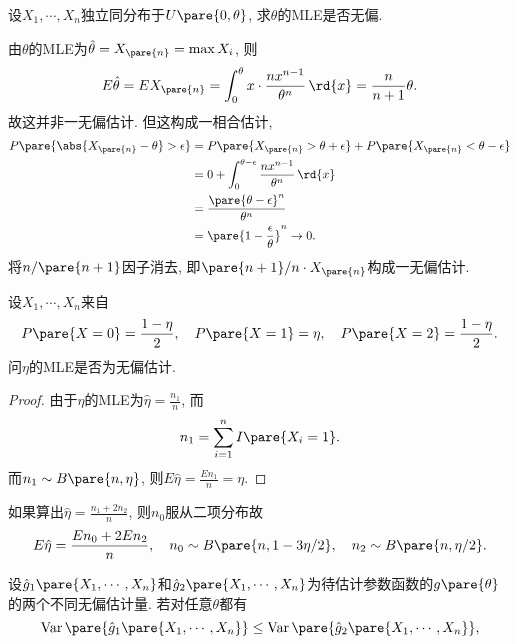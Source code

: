 \documentclass{ctexart}
\DeclareMathOperator{\Var}{Var}
\begin{document}
\begin{sample}
    \begin{ex}
        设$X_1,\cdots,X_n$独立同分布于$U\pare{0,\theta}$, 求$\theta$的MLE是否无偏.
    \end{ex}
    \begin{solution}
        由$\theta$的MLE为$\hat\theta = X_{\pare{n}} = \max X_i$, 则
        \[ E\hat{\theta} = EX_{\pare{n}} = \int_0^\theta x\cdot \frac{nx^{n-1}}{\theta^n}\,\rd{x} = \frac{n}{n+1}\theta. \]
        故这并非一无偏估计. 但这构成一相合估计,
        \begin{align*}
            P\pare{\abs{X_{\pare{n}}-\theta}>\epsilon} &= P\pare{X_{\pare{n}} > \theta + \epsilon} + P\pare{X_{\pare{n}} < \theta-\epsilon} \\
            &= 0 + \int_0^{\theta-\epsilon} \frac{nx^{n-1}}{\theta^n} \,\rd{x} \\
            &= \frac{\pare{\theta-\epsilon}^n}{\theta^n} \\
            &= \pare{1-\frac{\epsilon}{\theta}}^n \rightarrow 0. \qedhere
        \end{align*}
        将$n/\pare{n+1}$因子消去, 即$\pare{n+1}/n\cdot X_{\pare{n}}$构成一无偏估计.
    \end{solution}
\end{sample}
\begin{sample}
    \begin{ex}
        设$X_1,\cdots,X_n$来自
        \[ P\pare{X=0} = \frac{1-\eta}{2},\quad P\pare{X=1} = \eta,\quad P\pare{X=2} = \frac{1-\eta}{2}. \]
        问$\eta$的MLE是否为无偏估计.
    \end{ex}
    \begin{proof}
        由于$\eta$的MLE为$\displaystyle \hat\eta = \frac{n_1}{n}$, 而
        \[ n_1 = \sum_{i=1}^n I\pare{X_i = 1}. \]
        而$n_1\sim B\pare{n,\eta}$, 则$\displaystyle E\hat{\eta} = \frac{En_1}{n} = \eta$.
    \end{proof}
    \begin{remark}
        如果算出$\displaystyle \hat\eta = \frac{n_1+2n_2}{n}$, 则$n_0$服从二项分布故
        \[ E\hat\eta = \frac{En_0 + 2En_2}{n},\quad n_0 \sim B\pare{n, 1-3\eta/2},\quad n_2 \sim B\pare{n,\eta/2}. \]
    \end{remark}
\end{sample}
设$\hat{g}_1\pare{X_1,\cdots,X_n}$和$\hat{g}_2\pare{X_1,\cdots,X_n}$为待估计参数函数的$g\pare{\theta}$的两个不同无偏估计量. 若对任意$\theta$都有
\[ \Var\pare{\hat{g}_1\pare{X_1,\cdots,X_n}} \le \Var\pare{\hat{g}_2\pare{X_1,\cdots,X_n}}, \]
\end{document}
